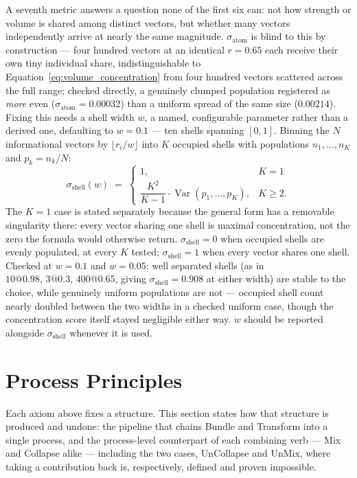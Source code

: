 \documentclass[12pt, a4paper]{article}
\begin{document}
A seventh metric answers a question none of the first six can: not
how strength or volume is shared among distinct vectors, but whether
many vectors independently arrive at nearly the same magnitude.
$\sigma_{\text{atom}}$ is blind to this by construction --- four
hundred vectors at an identical $r=0.65$ each receive their own tiny
individual share, indistinguishable to
Equation~\eqref{eq:volume_concentration} from four hundred vectors
scattered across the full range; checked directly, a genuinely
clumped population registered as \emph{more} even
($\sigma_{\text{atom}}=0.00032$) than a uniform spread of the same
size ($0.00214$). Fixing this needs a shell width $w$, a named,
configurable parameter rather than a derived one, defaulting to
$w=0.1$ --- ten shells spanning $[0,1]$. Binning the $N$
informational vectors by $\lfloor r_i/w\rfloor$ into $K$ occupied
shells with populations $n_1,\ldots,n_K$ and $p_k = n_k/N$:
\begin{equation}
    \sigma_{\text{shell}}(w) \;=\;
    \begin{cases}
        1, & K=1 \\[4pt]
        \dfrac{K^2}{K-1}\cdot\operatorname{Var}(p_1,\ldots,p_K), & K\ge 2.
    \end{cases}
    \label{eq:shell_concentration}
\end{equation}
The $K=1$ case is stated separately because the general form has a
removable singularity there: every vector sharing one shell is
maximal concentration, not the zero the formula would otherwise
return. $\sigma_{\text{shell}}=0$ when occupied shells are evenly
populated, at every $K$ tested; $\sigma_{\text{shell}}=1$ when every
vector shares one shell. Checked at $w=0.1$ and $w=0.05$: well
separated shells (as in $10@0.98,\,3@0.3,\,400@0.65$, giving
$\sigma_{\text{shell}}=0.908$ at either width) are stable to the
choice, while genuinely uniform populations are not --- occupied
shell count nearly doubled between the two widths in a checked
uniform case, though the concentration score itself stayed
negligible either way. $w$ should be reported alongside
$\sigma_{\text{shell}}$ whenever it is used.

\section{Process Principles}
\label{sec:process_principles}
Each axiom above fixes a structure. This section states how that
structure is produced and undone: the pipeline that chains Bundle
and Transform into a single process, and the process-level
counterpart of each combining verb --- Mix and Collapse alike ---
including the two cases, UnCollapse and UnMix, where taking a
contribution back is, respectively, defined and proven impossible.
\end{document}
